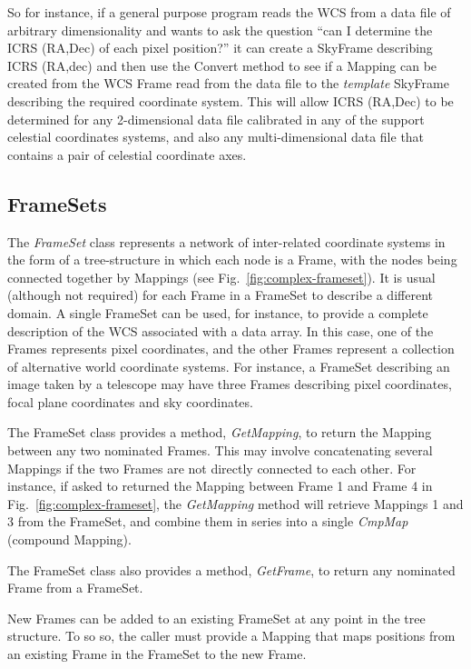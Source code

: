 \documentclass[final,authoryear,5p,times,twocolumn]{elsarticle}
\begin{document}
So for instance, if a general purpose program reads the WCS from a data
file of arbitrary dimensionality and wants to ask the question ``can I
determine the ICRS (RA,Dec) of each pixel position?'' it can create a
SkyFrame describing ICRS (RA,dec) and then use the Convert method to see
if a Mapping can be created from the WCS Frame read from the data file to
the \emph{template} SkyFrame describing the required coordinate system.
This will allow ICRS (RA,Dec) to be determined for any 2-dimensional data
file calibrated in any of the support celestial coordinates systems, and
also any multi-dimensional data file that contains a pair of celestial
coordinate axes.

\subsection{FrameSets}

The \emph{FrameSet} class represents a network of inter-related
coordinate systems in the form of a tree-structure in which each node
is a Frame, with the nodes being connected together by Mappings (see
Fig.~\ref{fig:complex-frameset}). It is
usual (although not required) for each Frame in a FrameSet to describe a
different domain. A single FrameSet can be used, for instance, to provide
a complete description of the WCS associated with a data array. In this
case, one of the Frames represents pixel coordinates, and the other
Frames represent a collection of alternative world coordinate systems.
For instance, a FrameSet describing an image taken by a telescope may
have three Frames describing pixel coordinates, focal plane coordinates
and sky coordinates.

The FrameSet class provides a method, \emph{GetMapping}, to return the
Mapping between any two nominated Frames. This may involve concatenating
several Mappings if the two Frames are not directly connected to each
other. For instance, if asked to returned the Mapping between Frame 1 and
Frame 4 in Fig.~\ref{fig:complex-frameset}, the \emph{GetMapping} method
will retrieve Mappings 1 and 3 from the FrameSet, and combine them in
series into a single \emph{CmpMap} (compound Mapping).

The FrameSet class also provides a method, \emph{GetFrame}, to
return any nominated Frame from a FrameSet.

New Frames can be added to an existing FrameSet at any point in the tree
structure. To so so, the caller must provide a Mapping that maps positions
from an existing Frame in the FrameSet to the new Frame.
\end{document}
